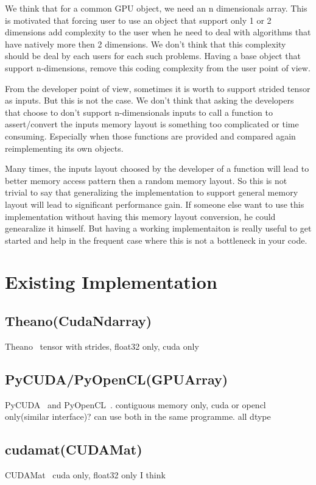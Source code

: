 \documentclass{article} %
\begin{document}
We think that for a common GPU object, we need an n dimensionals
array. This is motivated that forcing user to use an object that
support only 1 or 2 dimensions add complexity to the user when he need
to deal with algorithms that have natively more then 2 dimensions. We
don't think that this complexity should be deal by each users for each
such problems. Having a base object that support n-dimensions, remove
this coding complexity from the user point of view.

From the developer point of view, sometimes it is worth to support
strided tensor as inputs. But this is not the case. We don't think
that asking the developers that choose to don't support n-dimensionals
inputs to call a function to assert/convert the inputs memory layout
is something too complicated or time consuming. Especially when those
functions are provided and compared again reimplementing its own objects.

Many times, the inputs layout choosed by the developer of a function
will lead to better memory access pattern then a random memory
layout. So this is not trivial to say that generalizing the
implementation to support general memory layout will lead to
significant performance gain. If someone else want to use this
implementation without having this memory layout conversion, he could
genearalize it himself. But having a working implementaiton is really
useful to get started and help in the frequent case where this is not a
bottleneck in your code.



\section{Existing Implementation}
\subsection{Theano(CudaNdarray)}
Theano~\citep{bergstra+al:2010-scipy}
tensor with strides, float32 only, cuda only
\subsection{PyCUDA/PyOpenCL(GPUArray)}
PyCUDA~\citep{kloeckner_pycuda_2009} and PyOpenCL~\citep{kloeckner_pycuda_2009}.
contiguous memory only, cuda or opencl only(similar interface)?
can use both in the same programme. all dtype
\subsection{cudamat(CUDAMat)}
CUDAMat~\citep{cudamat-TR2009} cuda only, float32 only I think
\end{document}
